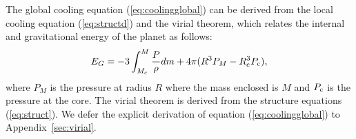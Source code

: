 \documentclass[apj]{emulateapj}
\newcommand{\App}[1]{Appendix~\ref{#1}}
\newcommand{\co}{_{\rm c}}
\begin{document}




The global cooling equation (\ref{eq:coolingglobal}) can be derived from the local cooling equation (\ref{eq:structd}) and the virial theorem, which relates the internal and gravitational energy of the planet as follows:
\begin{equation}
\label{eq:virial}
E_G=-3 \int_{M_c}^M \frac{P}{\rho} dm + 4 \pi (R^3 P_M-R\co^3 P\co),
\end{equation}
where $P_M$ is the pressure at radius $R$ where the mass enclosed is $M$ and $P\co$ is the pressure at the core. The virial theorem is derived from the structure equations (\ref{eq:struct}). We defer the explicit derivation of equation (\ref{eq:coolingglobal}) to \App{sec:virial}.




\end{document}
